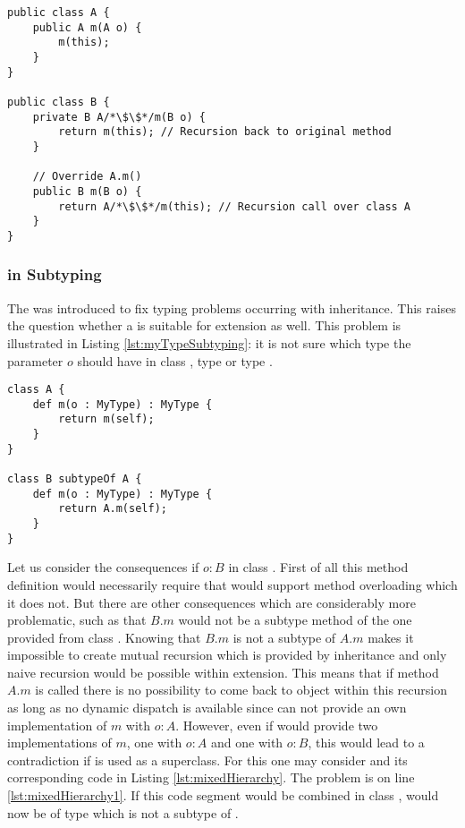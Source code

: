 \begin{lstlisting}[float=ht,caption=Subclassing with \mytype translated to Java,label=lst:javaTransMyTypeSubclassing]
public class A {
	public A m(A o) {
		m(this);
	}
}

public class B {
	private B A/*\$\$*/m(B o) {
		return m(this); // Recursion back to original method
	}

	// Override A.m()
	public B m(B o) {
		return A/*\$\$*/m(this); // Recursion call over class A
	}
}
\end{lstlisting}

\subsubsection{\mytype in Subtyping}
\label{ssec:mytypeInSubtype}
The \mytype was introduced to fix typing problems occurring with
inheritance. This raises the question whether a \mytype is suitable
for extension as well. This problem is illustrated in Listing
\ref{lst:myTypeSubtyping}: it is not sure which type the parameter
$o$ should have in class \B, type \B or type \A.

\begin{lstlisting}[float=ht,language=ooplss,caption=\mytype within subtyping contexts,label=lst:myTypeSubtyping]
class A {
	def m(o : MyType) : MyType {
		return m(self);
	}
}

class B subtypeOf A {
	def m(o : MyType) : MyType {
		return A.m(self);
	}
}
\end{lstlisting}

Let us consider the consequences if $o : B$ in class \B. First of all this
method definition would necessarily require that \ooplss would support
method overloading which it does not. But there are other consequences which
are considerably more problematic, such as that $B.m$ would not be a subtype method of the one
provided from class \A. Knowing that $B.m$ is not a subtype of $A.m$
makes it impossible to create mutual recursion which is provided by inheritance
and only naive recursion would be possible within extension. This means
that if method $A.m$ is called there is no possibility to come back to object \B
within this recursion as long as no dynamic dispatch is available since \B can
not provide an own implementation of $m$ with $o : A$. However, even if \B would
provide two implementations of $m$, one with $o : A$ and one with $o : B$, this
would lead to a contradiction if \B is used as a superclass. For this one may
consider  and its corresponding code in Listing
\ref{lst:mixedHierarchy}. The problem is on line \ref{lst:mixedHierarchy1}.
If this code segment would be combined in class \C, \self would now be of type
\C which is not a subtype of \A.

